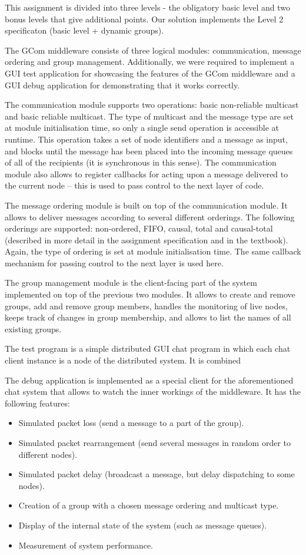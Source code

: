 \documentclass[10pt, oneside]{article}
\begin{document}
This assignment is divided into three levels - the obligatory basic level and
two bonus levels that give additional points. Our solution implements the Level
2 specificaton (basic level + dynamic groups).

The GCom middleware consists of three logical modules: communication, message
ordering and group management. Additionally, we were required to implement a GUI
test application for showcasing the features of the GCom middleware and a GUI
debug application for demonstrating that it works correctly.

The communication module supports two operations: basic non-reliable multicast
and basic reliable multicast. The type of multicast and the message type are set
at module initialisation time, so only a single send operation is accessible at
runtime. This operation takes a set of node identifiers and a message as input,
and blocks until the message has been placed into the incoming message queues of
all of the recipients (it is synchronous in this sense). The communication
module also allows to register callbacks for acting upon a message delivered to
the current node -- this is used to pass control to the next layer of code.

The message ordering module is built on top of the communication module. It
allows to deliver messages according to several different orderings. The
following orderings are supported: non-ordered, FIFO, causal, total and
causal-total (described in more detail in the assignment specification and in
the textbook\cite{Textbook}). Again, the type of ordering is set at module
initialisation time. The same callback mechanism for passing control to the next
layer is used here.

The group management module is the client-facing part of the system implemented
on top of the previous two modules. It allows to create and remove groups, add
and remove group members, handles the monitoring of live nodes, keeps track of
changes in group membership, and allows to list the names of all existing
groups.

The test program is a simple distributed GUI chat program in which each chat
client instance is a node of the distributed system. It is combined

The debug application is implemented as a special client for the aforementioned
chat system that allows to watch the inner workings of the middleware. It has
the following features:
\begin{itemize}
\item Simulated packet loss (send a message to a part of the group).
\item Simulated packet rearrangement (send several messages in random order to
  different nodes).
\item Simulated packet delay (broadcast a message, but delay dispatching to some
  nodes).
\item Creation of a group with a chosen message ordering and multicast type.
\item Display of the internal state of the system (such as message queues).
\item Measurement of system performance.
\end{itemize}
\end{document}
